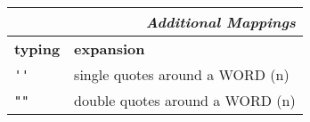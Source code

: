 \documentclass[oneside,12pt,a4paper,DIV18]{scrartcl}
\begin{document}
\begin{center}
%
\begin{minipage}[b]{70mm}%
\setlength{\fboxsep}{.25mm}%
\begin{spacing}{1.1}%
\begin{tabular}[]{|p{11mm}|p{55mm}|}%
\hline
\multicolumn{2}{|r|}{\textsl{Additional Mappings}}\\
\hline
\hline \textbf{typing}& \textbf{expansion}\\
\hline \verb"''"      & single quotes around a WORD    \hfill (n)\\
\hline \verb'""'      & double quotes around a WORD    \hfill (n)\\
\hline
\end{tabular}
\end{spacing}
\end{minipage}%
%
\end{center}
\end{document}
